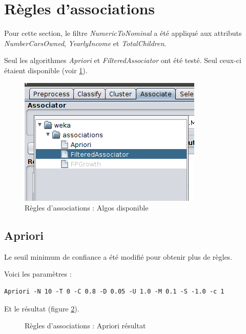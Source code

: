 \section{Règles d'associations}

Pour cette section, le filtre \textit{NumericToNominal} a été appliqué aux attributs \textit{NumberCarsOwned}, \textit{YearlyIncome} et \textit{TotalChildren}.

Seul les algorithmes \textit{Apriori} et \textit{FilteredAssociator} ont été testé. Seul ceux-ci étaient disponible (voir \ref{associate}).

\begin{figure}[H]
    \centering
    \includegraphics[width=0.5\linewidth, fbox]{img/associate.png}
    \caption{Règles d'associations : Algos disponible}
    \label{associate}
\end{figure}

\subsection{Apriori}

Le seuil minimum de confiance a été modifié pour obtenir plus de règles.

Voici les paramètres :

\begin{lstlisting}
Apriori -N 10 -T 0 -C 0.8 -D 0.05 -U 1.0 -M 0.1 -S -1.0 -c 1
\end{lstlisting}

Et le résultat (figure \ref{apriori}).

\begin{figure}[H]
    \centering
    \caption{Règles d'associations : Apriori résultat}
    \label{apriori}
\end{figure}

